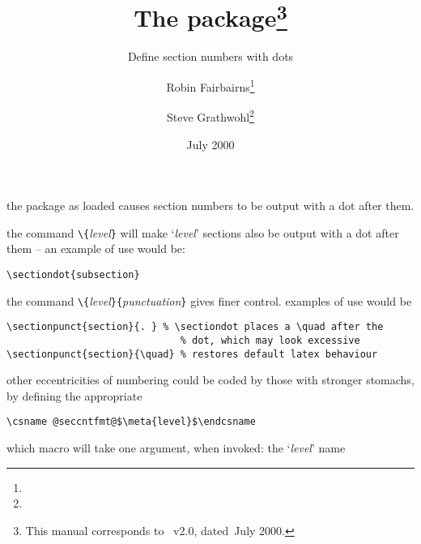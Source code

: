 \documentclass[pagesize=auto, fontsize=12pt, DIV=10, parskip=half]{scrartcl}
\title{The \pkg{secdot} package\thanks{This manual corresponds to \pkg{secdot.sty}~v2.0, dated~July 2000.}}
\subtitle{Define section numbers with dots}
\author{%
  Robin Fairbairns\thanks{\mail{rf10@cl.cam.ac.uk}}%
  \and Steve Grathwohl\thanks{\mail{Duke University}}%
}
\date{July 2000}
\makeatletter
\newcommand*{\cs}[1]{\texttt{\textbackslash#1}}
\newcommand*{\cmd}[1]{\cs{\expandafter\@gobble\string#1}}
\newcommand*{\meta}[1]{\textlangle\textsl{#1}\textrangle}
\newcommand*{\marg}[1]{\texttt{\{}\meta{#1}\texttt{\}}}
\makeatother
\begin{document}
\maketitle

the package as loaded causes section numbers to be output with a dot
after them.

the command \cmd{\sectiondot}\marg{level} will make `\meta{level}' sections also be
output with a dot after them -- an example of use would be:
%
\begin{lstlisting}
\sectiondot{subsection}
\end{lstlisting}

the command \cmd{\sectionpunct}\marg{level}\marg{punctuation} gives finer
control.  examples of use would be
%
\begin{lstlisting}
\sectionpunct{section}{. } % \sectiondot places a \quad after the
                              % dot, which may look excessive
\sectionpunct{section}{\quad} % restores default latex behaviour
\end{lstlisting}

other eccentricities of numbering could be coded by those with
stronger stomachs, by defining the appropriate
%
\begin{lstlisting}
\csname @seccntfmt@$\meta{level}$\endcsname
\end{lstlisting}
%
which macro will take one argument, when invoked: the `\meta{level}' name
\end{document}
